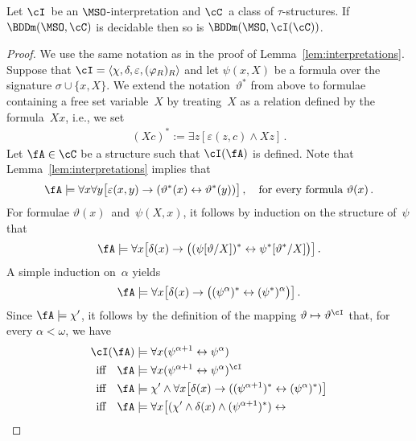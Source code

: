 \documentclass{LMCS}
\begin{document}
\begin{prop}\label{prop: boundedness and interpretations}
Let $\cI$~be an $\MSO$-interpretation and
$\cC$~a class of $\tau$-structures.
If\/ $\BDDm(\MSO,\cC)$ is decidable then so is $\BDDm(\MSO,\cI(\cC))$.
\end{prop}
\begin{proof}
We use the same notation as in the proof of Lemma~\ref{lem:interpretations}.
Suppose that $\cI = \langle\chi,\delta,\varepsilon,(\varphi_R)_R\rangle$
and let $\psi(x,X)$ be a formula over the signature $\sigma \cup \{x,X\}$.
We extend the notation~$\vartheta^*$ from above to formulae containing a free
set variable~$X$ by treating~$X$ as a relation defined by the formula~$Xx$, i.e.,
we set
\begin{align*}
  (Xc)^* := \exists z[\varepsilon(z,c) \land Xz]\,.
\end{align*}
Let $\fA \in \cC$ be a structure such that $\cI(\fA)$ is defined.
Note that Lemma~\ref{lem:interpretations} implies that
\begin{align*}
  \fA \models
    \forall x\forall y\bigl[\varepsilon(x,y) \to (\vartheta^*(x) \leftrightarrow \vartheta^*(y))\bigr]\,,
  \quad\text{for every formula } \vartheta(x)\,.
\end{align*}
For formulae $\vartheta(x)$~and~$\psi(X,x)$, it follows by induction on the structure of~$\psi$ that
\begin{align*}
  \fA \models
    \forall x\bigl[\delta(x) \to \bigl((\psi[\vartheta/X])^* \leftrightarrow \psi^*[\vartheta^*/X]\bigr)\bigr]\,.
\end{align*}
A simple induction on~$\alpha$ yields
\begin{align*}
  \fA \models \forall x\bigl[\delta(x) \to \bigl((\psi^\alpha)^* \leftrightarrow (\psi^*)^\alpha\bigr)\bigr]\,.
\end{align*}
Since $\fA \models \chi'$, it follows by the definition of the mapping $\vartheta \mapsto \vartheta^\cI$
that, for every $\alpha < \omega$, we have
\begin{align*}
  \cI(\fA) &\models \forall x(\psi^{\alpha+1} \leftrightarrow \psi^\alpha) \\
\text{iff}\quad
  \fA &\models \forall x(\psi^{\alpha+1} \leftrightarrow \psi^\alpha)^\cI \\
\text{iff}\quad
  \fA &\models \chi' \land \forall x\bigl[\delta(x) \to
               ((\psi^{\alpha+1})^* \leftrightarrow (\psi^\alpha)^*)\bigr] \\
\text{iff}\quad
  \fA &\models \forall x\bigl[(\chi' \land \delta(x) \land (\psi^{\alpha+1})^*) \leftrightarrow

\end{align*}
\end{proof}
\end{document}
